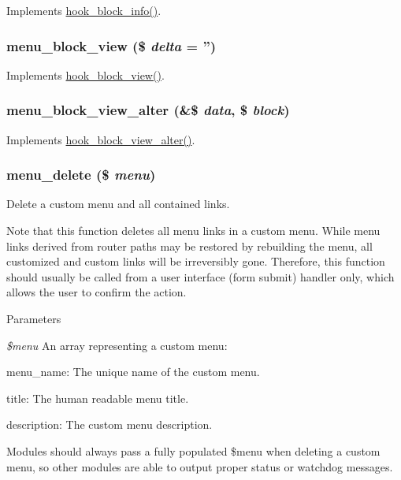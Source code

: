 \label{menu_8module_a214dafc0a386328b0819ac9c05852f4b}
Implements \hyperlink{group__hooks_ga2bd926c3e90deeba0c3ba64fb3c64d73}{hook\_\-block\_\-info()}. \hypertarget{menu_8module_a9e012505eaa177213bfedc5031da9e3a}{
\subsubsection[{menu\_\-block\_\-view}]{\setlength{\rightskip}{0pt plus 5cm}menu\_\-block\_\-view (\$ {\em delta} = {\ttfamily ''})}}
\label{menu_8module_a9e012505eaa177213bfedc5031da9e3a}
Implements \hyperlink{group__hooks_gaa14092a3e74cdc57aa295100cfd6860d}{hook\_\-block\_\-view()}. \hypertarget{menu_8module_a03a9506d2f9ea2f32c83a510dcee3968}{
\subsubsection[{menu\_\-block\_\-view\_\-alter}]{\setlength{\rightskip}{0pt plus 5cm}menu\_\-block\_\-view\_\-alter (\&\$ {\em data}, \/  \$ {\em block})}}
\label{menu_8module_a03a9506d2f9ea2f32c83a510dcee3968}
Implements \hyperlink{group__hooks_ga65868e8e24bb04e5eb9e533c4d413b10}{hook\_\-block\_\-view\_\-alter()}. \hypertarget{menu_8module_a73704d0b0e7a71562d8b5dbbc7e7eaa5}{
\subsubsection[{menu\_\-delete}]{\setlength{\rightskip}{0pt plus 5cm}menu\_\-delete (\$ {\em menu})}}
\label{menu_8module_a73704d0b0e7a71562d8b5dbbc7e7eaa5}
Delete a custom menu and all contained links.

Note that this function deletes all menu links in a custom menu. While menu links derived from router paths may be restored by rebuilding the menu, all customized and custom links will be irreversibly gone. Therefore, this function should usually be called from a user interface (form submit) handler only, which allows the user to confirm the action.


\begin{DoxyParams}{Parameters}
\item[{\em \$menu}]An array representing a custom menu:
\begin{DoxyItemize}
\item menu\_\-name: The unique name of the custom menu.
\item title: The human readable menu title.
\item description: The custom menu description.
\end{DoxyItemize}\end{DoxyParams}
Modules should always pass a fully populated \$menu when deleting a custom menu, so other modules are able to output proper status or watchdog messages.

